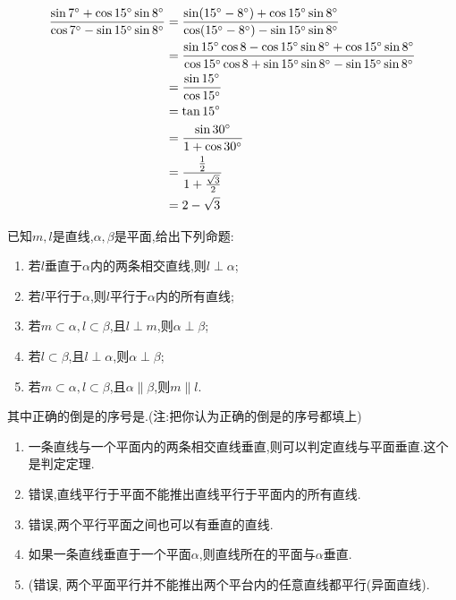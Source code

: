 \documentclass[answers]{exam}
\begin{document}
\begin{questions}
	\begin{solution}
		\begin{align*}
			\frac{\sin{\ang{7}}+\cos{\ang{15}}\sin{\ang{8}}}{\cos{\ang{7}}-\sin{\ang{15}}\sin{\ang{8}}}
			 & = \frac{\sin(\ang{15}-\ang{8}) + \cos\ang{15}\sin\ang8}{\cos(\ang{15}-\ang8) -\sin\ang{15}\sin\ang8} \\
			 & = \frac{\sin\ang{15}\cos8 - \cos\ang{15}\sin\ang8 + \cos\ang{15}\sin\ang8}
			{\cos\ang{15}\cos8 + \sin\ang{15}\sin\ang8 - \sin\ang{15}\sin\ang8}                                     \\
			 & = \frac{\sin\ang{15}}{\cos\ang{15}}                                                                  \\
			 & = \tan\ang{15}                                                                                       \\
			 & = \frac{\sin\ang{30}}{1+\cos\ang{30}}                                                                \\
			 & = \frac{\frac12}{1+\frac{\sqrt{3}}{2}}                                                               \\
			 & = 2 - \sqrt{3}
		\end{align*}
	\end{solution}

	\question 已知$m,l$是直线,$\alpha,\beta$是平面,给出下列命题:
	\begin{enumerate}[label=\protect\circled{\arabic*}]
		\item 若$l$垂直于$\alpha$内的两条相交直线,则$l\perp \alpha$;
		\item 若$l$平行于$\alpha$,则$l$平行于$\alpha$内的所有直线;
		\item 若$m\subset\alpha, l\subset\beta$,且$l\perp m$,则$\alpha\perp\beta$;
		\item 若$l\subset\beta$,且$l\perp\alpha$,则$\alpha\perp\beta$;
		\item 若$m\subset\alpha,l\subset\beta$,且$\alpha\parallel\beta$,则$m\parallel l$.
	\end{enumerate}
	其中正确的倒是的序号是.(注:把你认为正确的倒是的序号都填上)

	\begin{solution}
		\begin{enumerate}[label=\protect\circled{\arabic*}]
			\item 一条直线与一个平面内的两条相交直线垂直,则可以判定直线与平面垂直.这个是判定定理.
			\item 错误,直线平行于平面不能推出直线平行于平面内的所有直线.
			\item 错误,两个平行平面之间也可以有垂直的直线.
			\item 如果一条直线垂直于一个平面$\alpha$,则直线所在的平面与$\alpha$垂直.
			\item (错误, 两个平面平行并不能推出两个平台内的任意直线都平行(异面直线).
		\end{enumerate}
	\end{solution}


\end{questions}
\end{document}
